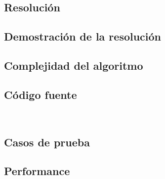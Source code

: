 \subsection{Resoluci\'on}







\subsection{Demostraci\'on de la resoluci\'on}


\subsection{Complejidad del algoritmo}


\subsection{C\'odigo fuente}

\begin{lstlisting}


\end{lstlisting}

\subsection{Casos de prueba}

\subsection{Performance}
